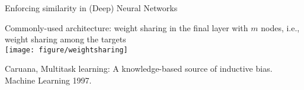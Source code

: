 \documentclass[11pt,compress,t,notes=noshow, xcolor=table]{beamer}
\begin{document}
\begin{frame}{Enforcing similarity in (Deep) Neural Networks}
	\small
	\begin{center}
		Commonly-used architecture: weight sharing in the final layer with $m$ nodes, i.e., weight sharing among the targets \\
		\vspace{0.2cm}
		\texttt{[image: figure/weightsharing]}
	\end{center}

{\tiny Caruana, Multitask learning: A knowledge-based source of inductive bias. Machine	Learning 1997.}
\end{frame}


%
\endlecture
\end{document}
